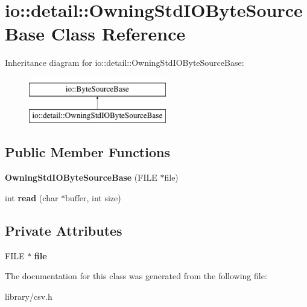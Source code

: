 \hypertarget{classio_1_1detail_1_1OwningStdIOByteSourceBase}{}\section{io\+:\+:detail\+:\+:Owning\+Std\+I\+O\+Byte\+Source\+Base Class Reference}
\label{classio_1_1detail_1_1OwningStdIOByteSourceBase}
Inheritance diagram for io\+:\+:detail\+:\+:Owning\+Std\+I\+O\+Byte\+Source\+Base\+:\begin{figure}[H]
\begin{center}
\leavevmode
\includegraphics[height=2.000000cm]{classio_1_1detail_1_1OwningStdIOByteSourceBase}
\end{center}
\end{figure}
\subsection*{Public Member Functions}
\begin{DoxyCompactItemize}
\item 
\mbox{\label{classio_1_1detail_1_1OwningStdIOByteSourceBase_a259f77d1a3c57720b54b88d9f8a3c018}} 
{\bfseries Owning\+Std\+I\+O\+Byte\+Source\+Base} (F\+I\+LE $\ast$file)
\item 
\mbox{\label{classio_1_1detail_1_1OwningStdIOByteSourceBase_a9269e7bfd07ebf2fa3518912fe7bebd0}} 
int {\bfseries read} (char $\ast$buffer, int size)
\end{DoxyCompactItemize}
\subsection*{Private Attributes}
\begin{DoxyCompactItemize}
\item 
\mbox{\label{classio_1_1detail_1_1OwningStdIOByteSourceBase_a00f62c8522d0fe9edadf3d094e94ae26}} 
F\+I\+LE $\ast$ {\bfseries file}
\end{DoxyCompactItemize}


The documentation for this class was generated from the following file\+:\begin{DoxyCompactItemize}
\item 
library/csv.\+h\end{DoxyCompactItemize}
